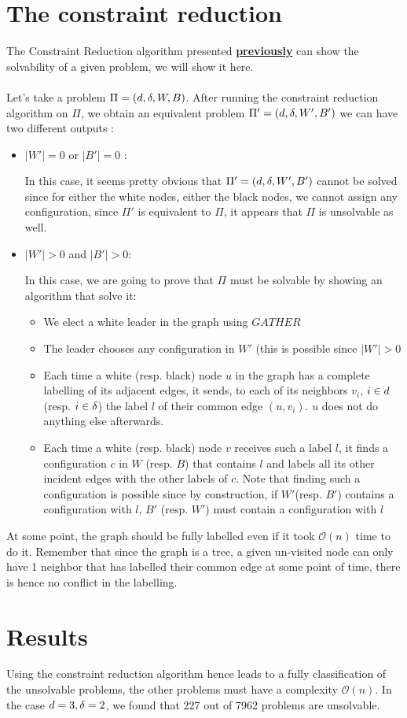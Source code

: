\section{The constraint reduction}
The Constraint Reduction algorithm presented \hyperref[sec:CR]{\textbf{previously}} can show the solvability of a given problem, we will show it here.\\\\
Let's take a problem $\Pi = (d,\delta,W,B)$. After running the constraint reduction algorithm on $\Pi$, we obtain an equivalent problem $\Pi' = (d,\delta,W',B')$ we can have two different outputs :
\begin{itemize}
    \item $|W'| = 0$ or $|B'| = 0$ :
    
    In this case, it seems pretty obvious that $\Pi' = (d,\delta,W',B')$ cannot be solved since for either the white nodes, either the black nodes, we cannot assign any configuration, since $\Pi'$ is equivalent to $\Pi$, it appears that $\Pi$ is unsolvable as well.
    \item  $|W'| > 0$ and $|B'| > 0$:
    
    In this case, we are going to prove that $\Pi$ must be solvable by showing an algorithm that solve it:
    \begin{itemize}
        \item We elect a white leader in the graph using $GATHER$
        \item The leader chooses any configuration in $W'$ (this is possible since $|W'|>0$
        \item Each time a white (resp. black) node $u$ in the graph has a complete labelling of its adjacent edges, it sends, to each of its neighbors $v_i$, $i\in d$ (resp. $i\in\delta$) the label $l$ of their common edge $(u,v_i)$. $u$ does not do anything else afterwards.
        \item Each time a white (resp. black) node $v$ receives such a label $l$, it finds a configuration $c$ in $W$ (resp. $B$) that contains $l$ and labels all its other incident edges with the other labels of $c$. Note that finding such a configuration is possible since by construction, if $W'$(resp. $B'$) contains a configuration with $l$, $B'$ (resp. $W'$) must contain a configuration with $l$
    \end{itemize}
\end{itemize}

At some point, the graph should be fully labelled even if it took $\mathcal{O}(n)$ time to do it. Remember that since the graph is a tree, a given un-visited node can only have 1 neighbor that has labelled their common edge at some point of time, there is hence no conflict in the labelling.

\section{Results}
Using the constraint reduction algorithm hence leads to a fully classification of the unsolvable problems, the other problems must have a complexity  $\mathcal{O}(n)$. In the case $d = 3, \delta = 2$, we found that 227 out of 7962 problems are unsolvable.